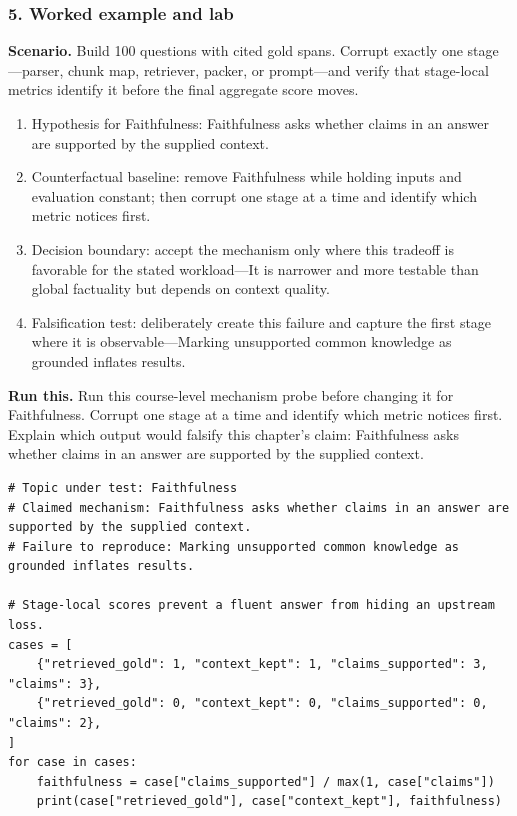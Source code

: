 \subsubsection*{5. Worked example and lab}
\textbf{Scenario.} Build 100 questions with cited gold spans. Corrupt exactly one stage—parser, chunk map, retriever, packer, or prompt—and verify that stage-local metrics identify it before the final aggregate score moves.
\begin{enumerate}
\item Hypothesis for Faithfulness: Faithfulness asks whether claims in an answer are supported by the supplied context.
\item Counterfactual baseline: remove Faithfulness while holding inputs and evaluation constant; then corrupt one stage at a time and identify which metric notices first.
\item Decision boundary: accept the mechanism only where this tradeoff is favorable for the stated workload—It is narrower and more testable than global factuality but depends on context quality.
\item Falsification test: deliberately create this failure and capture the first stage where it is observable—Marking unsupported common knowledge as grounded inflates results.
\end{enumerate}
\textbf{Run this.} Run this course-level mechanism probe before changing it for Faithfulness. Corrupt one stage at a time and identify which metric notices first. Explain which output would falsify this chapter's claim: Faithfulness asks whether claims in an answer are supported by the supplied context.
\begin{Verbatim}[fontsize=\scriptsize]
# Topic under test: Faithfulness
# Claimed mechanism: Faithfulness asks whether claims in an answer are supported by the supplied context.
# Failure to reproduce: Marking unsupported common knowledge as grounded inflates results.

# Stage-local scores prevent a fluent answer from hiding an upstream loss.
cases = [
    {"retrieved_gold": 1, "context_kept": 1, "claims_supported": 3, "claims": 3},
    {"retrieved_gold": 0, "context_kept": 0, "claims_supported": 0, "claims": 2},
]
for case in cases:
    faithfulness = case["claims_supported"] / max(1, case["claims"])
    print(case["retrieved_gold"], case["context_kept"], faithfulness)
\end{Verbatim}
